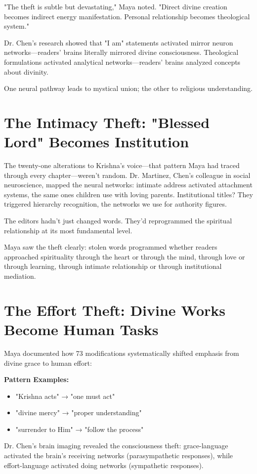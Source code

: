 \documentclass[11pt,twoside]{book}
\begin{document}
"The theft is subtle but devastating," Maya noted. "Direct divine creation becomes indirect energy manifestation. Personal relationship becomes theological system."

Dr. Chen's research showed that "I am" statements activated mirror neuron networks—readers' brains literally mirrored divine consciousness. Theological formulations activated analytical networks—readers' brains analyzed concepts about divinity.

One neural pathway leads to mystical union; the other to religious understanding.
\section*{The Intimacy Theft: "Blessed Lord" Becomes Institution}
\label{sec:orgff22a36}

The twenty-one alterations to Krishna's voice—that pattern Maya had traced through every chapter—weren't random. Dr. Martinez, Chen's colleague in social neuroscience, mapped the neural networks: intimate address activated attachment systems, the same ones children use with loving parents. Institutional titles? They triggered hierarchy recognition, the networks we use for authority figures. 

The editors hadn't just changed words. They'd reprogrammed the spiritual relationship at its most fundamental level.

Maya saw the theft clearly: stolen words programmed whether readers approached spirituality through the heart or through the mind, through love or through learning, through intimate relationship or through institutional mediation.
\section*{The Effort Theft: Divine Works Become Human Tasks}
\label{sec:orgfaa1d18}

Maya documented how 73 modifications systematically shifted emphasis from divine grace to human effort:

\textbf{\textbf{Pattern Examples:}}
\begin{itemize}
\item "Krishna acts" → "one must act"
\item "divine mercy" → "proper understanding"
\item "surrender to Him" → "follow the process"
\end{itemize}

Dr. Chen's brain imaging revealed the consciousness theft: grace-language activated the brain's receiving networks (parasympathetic responses), while effort-language activated doing networks (sympathetic responses).
\end{document}
